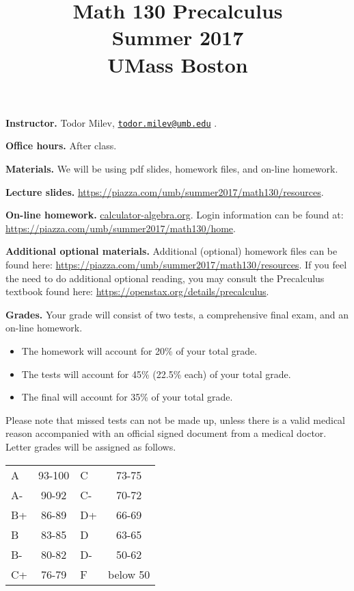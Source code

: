 \documentclass{article}
\title{\vskip -2cm 
 Math 130 Precalculus \\ Summer 2017\\ UMass Boston}
\date{}
\newcommand{\websitebase}{https://piazza.com/umb/summer2017/math130}
\begin{document}
\maketitle

\noindent \textbf{Instructor.} Todor Milev, \href{mailto:todor.milev@umb.edu}{\nolinkurl{todor.milev@umb.edu}} \quad \quad \quad .

\medskip
\noindent \textbf{Office hours. } After class.

\medskip\noindent \textbf{Materials. } We will be using pdf slides, homework files, and on-line homework.


\medskip \noindent \textbf{Lecture slides. } \url{\websitebase/resources}.

\medskip \noindent \textbf{On-line homework. } \url{calculator-algebra.org}. Login information can be found at: \url{\websitebase/home}.

\medskip \noindent \textbf{Additional optional materials. } Additional (optional) homework files can be found here: \url{\websitebase/resources}. If you feel the need to do additional optional reading, you may consult the Precalculus textbook found here: \url{https://openstax.org/details/precalculus}.




\medskip
\noindent \textbf{Grades.} Your grade will consist of two tests, a comprehensive final exam, and an on-line homework.
\begin{itemize}
\item The homework will account for 20\% of your total grade.
\item The tests will account for 45\% (22.5\% each) of your total grade.
\item The final will account for 35\% of your total grade.
\end{itemize}
Please note that missed tests can not be made up, unless there is a valid medical reason accompanied with an official signed document from a medical doctor. Letter grades will be assigned as follows. 

\begin{center}
\begin{tabular}{lc|lc}
A & 93-100 & C  & 73-75 \\
A-& 90-92  & C- & 70-72 \\
B+& 86-89  & D+ & 66-69 \\
B & 83-85  & D  & 63-65\\
B-& 80-82  & D- & 50-62\\
C+& 76-79  & F  & below 50\\
\end{tabular}

\end{center}
\end{document}
